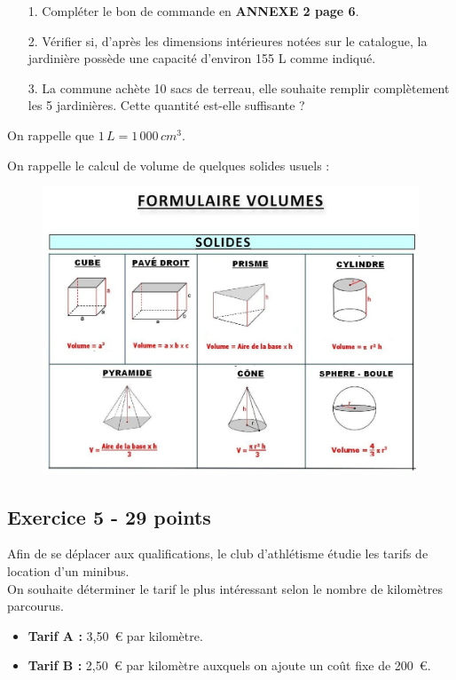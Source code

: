\begin{enumerate}
  \item[1.] Compléter le bon de commande en \textbf{ANNEXE 2 page 6}. \\
  \item[2.] Vérifier si, d’après les dimensions intérieures notées sur le catalogue, la jardinière possède une capacité d’environ 155 L comme indiqué. \\
  \item[3.] La commune achète 10 sacs de terreau, elle souhaite remplir complètement les 5 jardinières. Cette quantité est-elle suffisante ?
\end{enumerate}

On rappelle que $1\,L = 1\,000\,cm^3$. 

On rappelle le calcul de volume de quelques solides usuels :


\begin{figure}[H]
  \centering
  \includegraphics[width=0.8\linewidth]{pro-ex5-formu.png}
\end{figure}

\subsection*{Exercice 5 - 29 points }

Afin de se déplacer aux qualifications, le club d'athlétisme étudie les tarifs de location d'un minibus. \\

On souhaite déterminer le tarif le plus intéressant selon le nombre de kilomètres parcourus. 

\begin{itemize}
  \item \textbf{Tarif A :} 3,50~\euro{} par kilomètre.
  \item \textbf{Tarif B :} 2,50~\euro{} par kilomètre auxquels on ajoute un coût fixe de 200~\euro.
\end{itemize}

